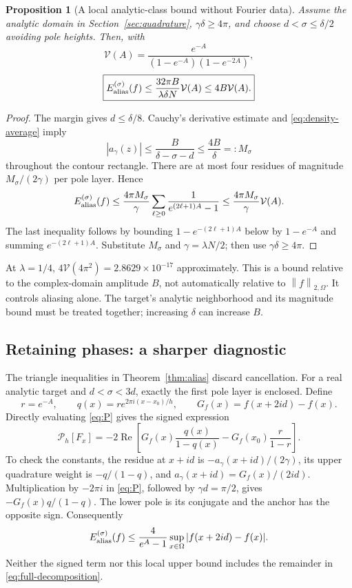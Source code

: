 \documentclass[11pt]{article}
\newtheorem{proposition}[theorem]{Proposition}
\theoremstyle{definition}\newtheorem{definition}[theorem]{Definition}
\theoremstyle{remark}\newtheorem{remark}[theorem]{Remark}
\numberwithin{equation}{section}
\newcommand{\norm}[1]{\left\lVert#1\right\rVert}
\newcommand{\Perr}{\mathcal P_h}
\begin{document}
\begin{proposition}[A local analytic-class bound without Fourier data]
\label{prop:class}
Assume the analytic domain in Section~\ref{sec:quadrature}, $\gamma\delta\ge4\pi$, and choose $d<\sigma\le\delta/2$ avoiding pole heights. Then, with
\begin{equation}
 \mathcal V(A)=\frac{e^{-A}}{(1-e^{-A})(1-e^{-2A})},
 \label{eq:V}
\end{equation}
\begin{equation}
 \boxed{E_{\rm alias}^{(\sigma)}(f)
 \le\frac{32\pi B}{\lambda\delta N}\mathcal V(A)
 \le4B\mathcal V(A).}
 \label{eq:class}
\end{equation}
\end{proposition}
\begin{proof}
The margin gives $d\le\delta/8$. Cauchy's derivative estimate and \eqref{eq:density-average} imply
\[
 |a_\gamma(z)|\le\frac{B}{\delta-\sigma-d}
 \le\frac{4B}{\delta}=:M_\sigma
\]
throughout the contour rectangle. There are at most four residues of magnitude $M_\sigma/(2\gamma)$ per pole layer. Hence
\[
 E_{\rm alias}^{(\sigma)}(f)
 \le\frac{4\pi M_\sigma}{\gamma}
 \sum_{\ell\ge0}\frac1{e^{(2\ell+1)A}-1}
 \le\frac{4\pi M_\sigma}{\gamma}\mathcal V(A).
\]
The last inequality follows by bounding $1-e^{-(2\ell+1)A}$ below by $1-e^{-A}$ and summing $e^{-(2\ell+1)A}$. Substitute $M_\sigma$ and $\gamma=\lambda N/2$; then use $\gamma\delta\ge4\pi$.
\end{proof}
At $\lambda=1/4$, $4\mathcal V(4\pi^2)=2.8629\times10^{-17}$ approximately. This is a bound relative to the complex-domain amplitude $B$, not automatically relative to $\norm f_{2,\Omega}$. It controls aliasing alone. The target's analytic neighborhood and its magnitude bound must be treated together; increasing $\delta$ can increase $B$.

\subsection{Retaining phases: a sharper diagnostic}
The triangle inequalities in Theorem~\ref{thm:alias} discard cancellation. For a real analytic target and $d<\sigma<3d$, exactly the first pole layer is enclosed. Define
\[
 r=e^{-A},\qquad q(x)=r e^{2\pi i(x-x_0)/h},\qquad
 G_f(x)=f(x+2id)-f(x).
\]
Directly evaluating \eqref{eq:P} gives the signed expression
\begin{equation}
 \Perr[F_x]=-2\operatorname{Re}\left[
 G_f(x)\frac{q(x)}{1-q(x)}
 -G_f(x_0)\frac{r}{1-r}\right].
 \label{eq:signed}
\end{equation}
To check the constants, the residue at $x+id$ is $-a_\gamma(x+id)/(2\gamma)$, its upper quadrature weight is $-q/(1-q)$, and $a_\gamma(x+id)=G_f(x)/(2id)$. Multiplication by $-2\pi i$ in \eqref{eq:P}, followed by $\gamma d=\pi/2$, gives $-G_f(x)q/(1-q)$. The lower pole is its conjugate and the anchor has the opposite sign. Consequently
\begin{equation}
 E_{\rm alias}^{(\sigma)}(f)
 \le\frac4{e^A-1}\sup_{x\in\Omega}|f(x+2id)-f(x)|.
 \label{eq:local-difference}
\end{equation}
Neither the signed term nor this local upper bound includes the remainder in \eqref{eq:full-decomposition}.
\end{document}
